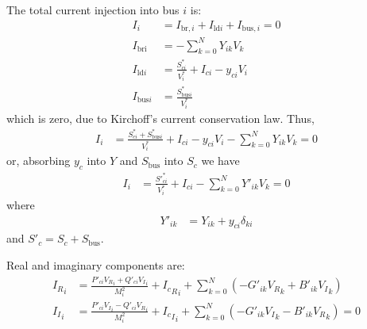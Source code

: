 \documentclass[11pt]{article}
\newcommand{\re}[1]{{{#1}_R}}
\newcommand{\im}[1]{{{#1}_I}}
\begin{document}
The total current injection into bus $i$ is:
\begin{align}
I_i &= I_{\text{br}, i} + I_{\text{ld}i} + I_{\text{bus}, i} = 0\\
I_{\text{bri}} &= -\sum_{k=0}^NY_{ik}V_k \\
I_{\text{ld}i} &= \frac{S^*_{ci}}{V^*_i} + I_{ci} - y_{ci}V_i \\
I_{\text{bus}i} &= \frac{S^*_{\text{bus}i}}{V^*_i}
\end{align}
which is zero, due to Kirchoff's current conservation law. Thus,
\begin{align}
I_i &= \frac{S^*_{ci} + S^*_{\text{bus}i}}{V^*_i} + I_{ci} - y_{ci}V_i - \sum_{k=0}^NY_{ik}V_k = 0
\end{align}
or, absorbing $y_c$ into $Y$ and $S_{\text{bus}}$ into $S_c$ we have
\begin{align}
I_i &= \frac{S'^*_{ci}}{V^*_i} + I_{ci} - \sum_{k=0}^NY'_{ik}V_k = 0
\end{align}
where
\begin{align}
	Y'_{ik} &= Y_{ik} + y_{ci}\delta_{ki}
\end{align}
and $S'_c = S_c + S_{\text{bus}}$.

Real and imaginary components are:
\begin{align}
\re{I}_i &= \frac{P'_{ci}\re{V}_{i} + Q'_{ci}\im{V}_{i}}{M^2_i} + \re{I_c}_{i} + \sum_{k=0}^N\left(-G'_{ik}\re{V}_k + B'_{ik}\im{V}_k\right) \\
\im{I}_i &= \frac{P'_{ci}\im{V}_{i} - Q'_{ci}\re{V}_{i}}{M^2_i} + \im{I_c}_{i} + \sum_{k=0}^N\left(-G'_{ik}\im{V}_k - B'_{ik}\re{V}_k\right) = 0
\end{align}
\end{document}
